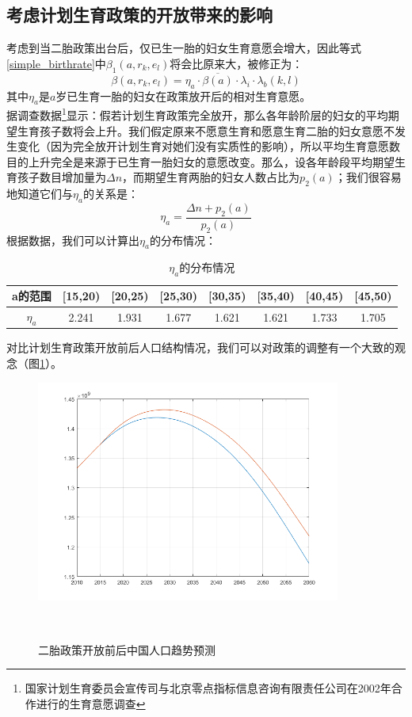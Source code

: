 \documentclass[a4paper]{article}
\begin{document}
\subsection{考虑计划生育政策的开放带来的影响}
\label{amend_section_3}
考虑到当二胎政策出台后，仅已生一胎的妇女生育意愿会增大，因此等式\ref{simple_birthrate}中$\beta_1(a, r_k, e_l)$将会比原来大，被修正为：
	\begin{equation}
		\label{amend_birthrate_policydown}
		\beta(a, r_k, e_l) = \eta_a \cdot \overline{\beta(a)} \cdot \lambda_i \cdot \lambda_b(k,l)
	\end{equation}
其中$\eta_a$是$a$岁已生育一胎的妇女在政策放开后的相对生育意愿。\\
\indent
据调查数据\footnote{国家计划生育委员会宣传司与北京零点指标信息咨询有限责任公司在2002年合作进行的生育意愿调查}显示：假若计划生育政策完全放开，那么各年龄阶层的妇女的平均期望生育孩子数将会上升。我们假定原来不愿意生育和愿意生育二胎的妇女意愿不发生变化（因为完全放开计划生育对她们没有实质性的影响），所以平均生育意愿数目的上升完全是来源于已生育一胎妇女的意愿改变。那么，设各年龄段平均期望生育孩子数目增加量为$\Delta n$，而期望生育两胎的妇女人数占比为$p_2(a)$；我们很容易地知道它们与$\eta_a$的关系是：
	\begin{equation}
		\label{amend_eta_a}
		\eta_a = 	\frac{\Delta n + p_2(a)}{p_2(a)}
	\end{equation}
根据数据，我们可以计算出$\eta_a$的分布情况：
	\begin{table}[H]
		\centering
		\caption{$\eta_a$的分布情况}
		\label{amend_eta_a_value}
		\begin{tabular}{c|ccccccc}
			\hline
			a的范围		&	[15,20)	&	[20,25)	&	[25,30)	&	[30,35)	&	[35,40)	&	[40,45)	&	[45,50)	\\
			\hline
			$\eta_a$	&	 2.241		&	1.931		&	1.677		&	1.621		&	1.621		&	1.733		&	1.705		\\
			\hline
		\end{tabular}
	\end{table}
对比计划生育政策开放前后人口结构情况，我们可以对政策的调整有一个大致的观念（图\ref{amend_4}）。
	\begin{figure}[htbp]
		\centering
		\includegraphics[width=10cm]{pics/amend_4.png}
		\caption{二胎政策开放前后中国人口趋势预测} 
		 \\
		\label{amend_4}	
	\end{figure}
\end{document}
